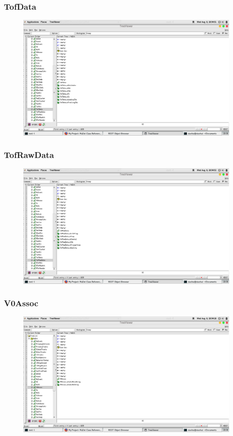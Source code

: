 \documentclass[10pt]{beamer}
\begin{document}
\label{TofData}
\begin{frame}
  \frametitle{TofData}
  \begin{figure}[hbtp]
    \centering
    \includegraphics[width=\textwidth]{TofData.png}
  \end{figure}
\end{frame}
\label{TofRawData}
\begin{frame}
  \frametitle{TofRawData}
  \begin{figure}[hbtp]
    \centering
    \includegraphics[width=\textwidth]{TofRawData.png}
  \end{figure}
\end{frame}
\label{V0Assoc}
\begin{frame}
  \frametitle{V0Assoc}
  \begin{figure}[hbtp]
    \centering
    \includegraphics[width=\textwidth]{V0Assoc.png}
  \end{figure}
\end{frame}
\end{document}
